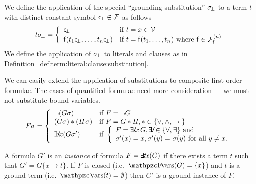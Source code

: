 \begin{definition}\label{def:grounding:substitution}
	We define the application of the special “grounding substitution” \( \subsbot \) to a term \( t \) with distinct constant symbol \( \consbot \not\in\mcF \)
	as follows
	\begin{gather*}
	\MDEFINE{t\subsbot}{ll}{
			\consbot & \text{if }t=x\in\mcV
			\\
			\mf(t_1\consbot,\ldots,t_n\consbot)	&\text{if }t=\mf(t_1,\ldots,t_n)
			\text{ where  }
			 \mf\in\mcFfn
			 }
	\end{gather*}
	We define the application of \( \subsbot \) to literals and clauses as in
	Definition~\vref{def:term:literal:clause:substitution}.
\end{definition}

\begin{definition}
	We can easily extend the application of substitutions
	to composite first order formulae.
	The cases of quantified formulae need more consideration ---
	we must not substitute bound variables.
	\begin{gather*}
	\MDEFINE{F\sigma}{ll}{
		\lnot(G\sigma) & \text{if }F = \lnot G
		\\
		(G\sigma) \connect (H\sigma) & \text{if }F = G * H,
		\connect\in\SetOfConnectives
		\\
		\quantify x (G\sigma')
		&
		\text{if }
		\left\{  %
			\begin{array}{l}
				F = \quantify x\,G,
				\quantify\in\SetOfQuantifiers
				\text{ and}
				\\
				\sigma'(x) = x, \sigma'(y) = \sigma(y)
				\text{ for all } y \neq x.
		\end{array}
		\right.
	}
	\end{gather*}
\end{definition}

\begin{definition}
	A formula \( G' \) is an \emph{instance} of formula \( F = \quantify x (G) \)
	if there exists a term \( t \) such that \( G' = G\{ x\mapsto t \} \).
	If \( F \) is closed (i.e.\ \( \fvar(G) = \{ x \} \)) %
	and \( t \) is a ground term (i.e.\ \( \var(t) = \emptyset \)) then %
	\( G' \) is a ground instance of \( F \).
\end{definition}

